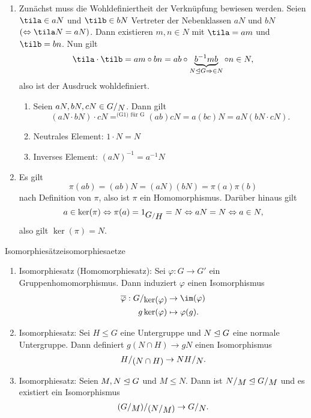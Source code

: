 \begin{beweis}
\begin{enumerate}
\item Zunächst muss die Wohldefiniertheit der Verknüpfung bewiesen werden. Seien $\tila \in aN$ und $\tilb \in bN$ Vertreter der Nebenklassen $aN$ und $bN$ $(\iff \tila N = aN)$. Dann existieren $m,n \in N$ mit $\tila = am$ und $\tilb = bn$. Nun gilt
\begin{equation}
\tila \cdot \tilb = am \circ bn = ab \circ \underbrace{b^{-1} mb}_{N \trianglelefteq G \implies \in N} \circ n \in N,
\end{equation}
also ist der Ausdruck wohldefiniert.
\begin{enumerate}[({G}1)]
\item Seien $aN, bN, cN \in \quotient{G}{N}$. Dann gilt
\begin{equation}
(aN \cdot bN) \cdot cN =^{\text{(G1) für G}} (ab)cN = a(bc)N = aN(bN \cdot cN).
\end{equation}
\item Neutrales Element: $1 \cdot N = N$
\item Inverses Element: $(aN)^{-1} = a^{-1} N$
\end{enumerate}
\item Es gilt 
\begin{equation}
\pi (ab)  = (ab)N = (aN)(bN)=\pi(a)\pi(b)
\end{equation}
nach Definition von $\pi$, also ist $\pi$ ein Homomorphismus. Darüber hinaus gilt
\begin{equation}
a \in \ker (\pi) \iff \pi(a) = 1_{\quotient{G}{H}} = N \iff aN = N \iff a \in N,
\end{equation}
also gilt $\ker (\pi) = N$.
\end{enumerate}
\end{beweis}
\begin{theorem}{Isomorphiesätze}{isomorphiesaetze}
\begin{enumerate}
\item Isomorphiesatz (Homomorphiesatz): Sei $\varphi: G \to G'$ ein Gruppenhomomorphismus. Dann induziert $\varphi$ einen Isomorphismus
\begin{align}
\overline{\varphi} : \quotient{G}{\ker (\varphi)} &\to \im (\varphi)\\
g \ker (\varphi) &\mapsto \varphi(g).
\end{align}
\item Isomorphiesatz: Sei $H \leq G$ eine Untergruppe und $N \trianglelefteq G$ eine normale Untergruppe. Dann definiert $g(N \cap H) \to gN$ einen Isomorphismus 
\begin{equation}
\quotient{H}{(N\cap H)} \to \quotient{NH}{N}.
\end{equation}
\item Isomorphiesatz: Seien $M, N \trianglelefteq G$ und $M \leq N$. Dann ist $\quotient{N}{M} \lnormal \quotient{G}{M}$ und es existiert ein Isomorphismus
\begin{equation}
\quotient{(\quotient{G}{M})}{(\quotient{N}{M})} \to \quotient{G}{N}.
\end{equation}
\end{enumerate}
\end{theorem}
